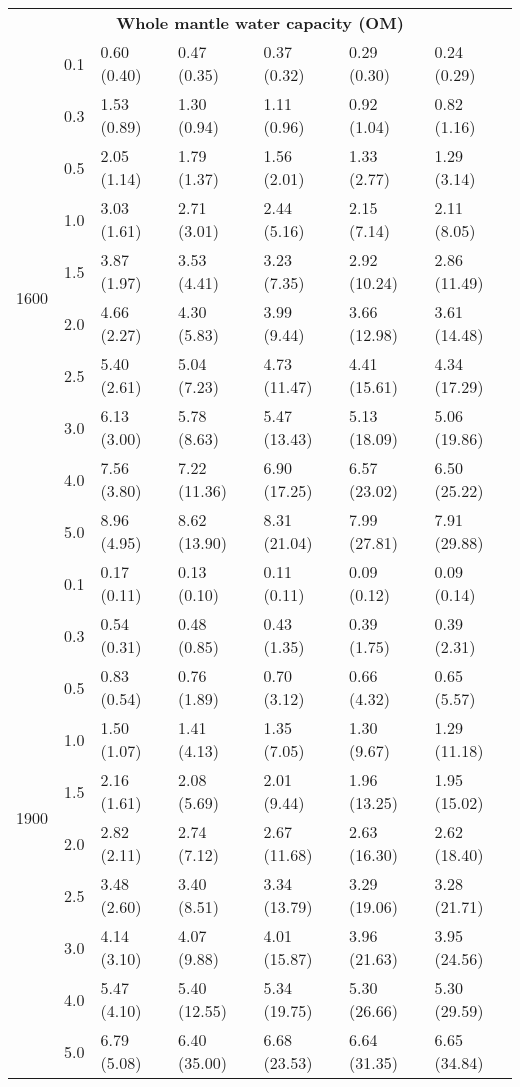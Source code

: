 \begin{table*}
\begin{tabular}{@{} c c l l l l l @{}}
\multicolumn{7}{c}{\textbf{Whole mantle water capacity (OM)}} \\
\multirow{10}{*}{1600} & 0.1 & 0.60 (0.40) & 0.47 (0.35) & 0.37 (0.32) & 0.29 (0.30) & 0.24 (0.29) \\
 & 0.3 & 1.53 (0.89) & 1.30 (0.94) & 1.11 (0.96) & 0.92 (1.04) & 0.82 (1.16) \\
 & 0.5 & 2.05 (1.14) & 1.79 (1.37) & 1.56 (2.01) & 1.33 (2.77) & 1.29 (3.14) \\
 & 1.0 & 3.03 (1.61) & 2.71 (3.01) & 2.44 (5.16) & 2.15 (7.14) & 2.11 (8.05) \\
 & 1.5 & 3.87 (1.97) & 3.53 (4.41) & 3.23 (7.35) & 2.92 (10.24) & 2.86 (11.49) \\
 & 2.0 & 4.66 (2.27) & 4.30 (5.83) & 3.99 (9.44) & 3.66 (12.98) & 3.61 (14.48) \\
 & 2.5 & 5.40 (2.61) & 5.04 (7.23) & 4.73 (11.47) & 4.41 (15.61) & 4.34 (17.29) \\
 & 3.0 & 6.13 (3.00) & 5.78 (8.63) & 5.47 (13.43) & 5.13 (18.09) & 5.06 (19.86) \\
 & 4.0 & 7.56 (3.80) & 7.22 (11.36) & 6.90 (17.25) & 6.57 (23.02) & 6.50 (25.22) \\
 & 5.0 & 8.96 (4.95) & 8.62 (13.90) & 8.31 (21.04) & 7.99 (27.81) & 7.91 (29.88) \\
\hline
\multirow{10}{*}{1900} & 0.1 & 0.17 (0.11) & 0.13 (0.10) & 0.11 (0.11) & 0.09 (0.12) & 0.09 (0.14) \\
 & 0.3 & 0.54 (0.31) & 0.48 (0.85) & 0.43 (1.35) & 0.39 (1.75) & 0.39 (2.31) \\
 & 0.5 & 0.83 (0.54) & 0.76 (1.89) & 0.70 (3.12) & 0.66 (4.32) & 0.65 (5.57) \\
 & 1.0 & 1.50 (1.07) & 1.41 (4.13) & 1.35 (7.05) & 1.30 (9.67) & 1.29 (11.18) \\
 & 1.5 & 2.16 (1.61) & 2.08 (5.69) & 2.01 (9.44) & 1.96 (13.25) & 1.95 (15.02) \\
 & 2.0 & 2.82 (2.11) & 2.74 (7.12) & 2.67 (11.68) & 2.63 (16.30) & 2.62 (18.40) \\
 & 2.5 & 3.48 (2.60) & 3.40 (8.51) & 3.34 (13.79) & 3.29 (19.06) & 3.28 (21.71) \\
 & 3.0 & 4.14 (3.10) & 4.07 (9.88) & 4.01 (15.87) & 3.96 (21.63) & 3.95 (24.56) \\
 & 4.0 & 5.47 (4.10) & 5.40 (12.55) & 5.34 (19.75) & 5.30 (26.66) & 5.30 (29.59) \\
 & 5.0 & 6.79 (5.08) & 6.40 (35.00) & 6.68 (23.53) & 6.64 (31.35) & 6.65 (34.84) \\
\hline

\end{tabular}
\end{table*}
